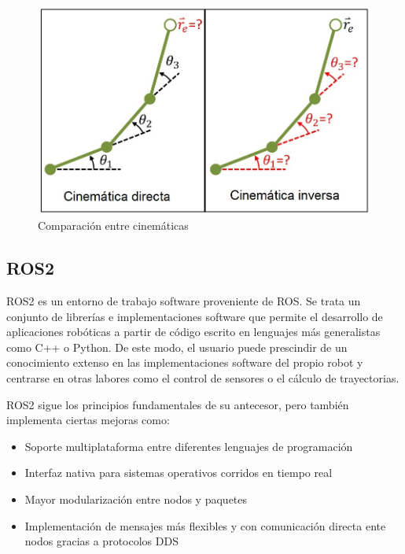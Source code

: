 \begin{figure}[h!]
    \centering
    \includegraphics[scale=0.4]{figuras/ik_vs_fk.jpg}
    \caption{Comparación entre cinemáticas \cite{Najam_R_Syed_kinematics_webpage}}
    \label{fig: comparacion cinematicas}
\end{figure}

\subsection{ROS2} \label{section: presentacion ROS2}
ROS2 es un entorno de trabajo software proveniente de \acrshort{ROS}. Se trata un conjunto de librerías e implementaciones software que permite el desarrollo de aplicaciones robóticas a partir de código escrito en lenguajes más generalistas como C++ o Python. De este modo, el usuario puede prescindir de un conocimiento extenso en las implementaciones software del propio robot y centrarse en otras labores como el control de sensores o el cálculo de trayectorias. 

ROS2 sigue los principios fundamentales de su antecesor, pero también implementa ciertas mejoras como:
\begin{itemize}
    \item Soporte multiplataforma entre diferentes lenguajes de programación
    \item Interfaz nativa para sistemas operativos corridos en tiempo real
    \item Mayor modularización entre nodos y paquetes
    \item Implementación de mensajes más flexibles y con comunicación directa ente nodos gracias a protocolos \acrshort{DDS}
\end{itemize}

